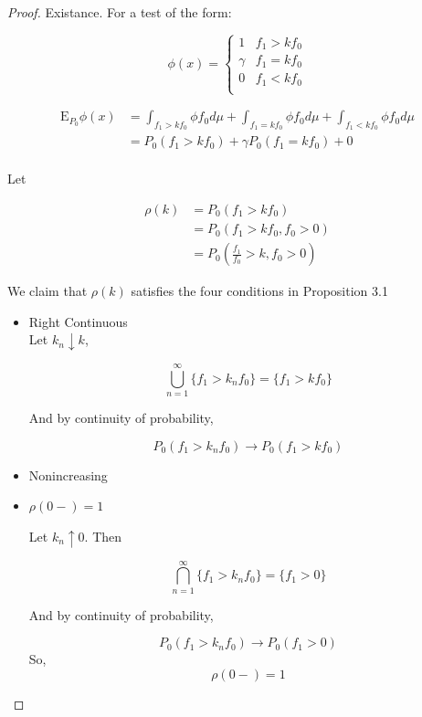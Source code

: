 \documentclass[11pt,fleqn]{book} %
\newcommand{\E}{\mathrm{E}}
\begin{document}
 \begin{proof}
 	Existance. For a test of the form: 

 			$$\phi(x) = \left\{\begin{array}{ll}
 				1 & f_1 > k f_0\\
 				\gamma & f_1 = k f_0\\
 				0 & f_1 < k f_0\\
 			\end{array} \right. $$

 			\begin{align*}
 				\E_{P_0} \phi(x) &= \int_{f_1 > k f_0} \phi f_0 d\mu + \int_{f_1 = k f_0} \phi f_0 d\mu + \int_{f_1 < k f_0} \phi f_0 d\mu\\
 					&=P_0(f_1 > k f_0) + \gamma P_0(f_1 = k f_0) + 0\\
 			\end{align*}

 	Let 

 			\begin{align*}
 				\rho(k) &= P_0(f_1 > k f_0)\\
 					&= P_0(f_1 > k f_0, f_0 > 0)\\
 					&= P_0 (\frac{f_1}{f_0} > k, f_0> 0)
 			\end{align*}

 	We claim that $\rho(k)$ satisfies the four conditions in Proposition 3.1

 			\begin{itemize}
 				\item Right Continuous\\

						Let $k_n \downarrow k$, 

								$$\bigcup^\infty_{n = 1} \{f_1 > k_n f_0\} = \{f_1 > k f_0\} $$ 
								
						And by continuity of probability, 

								$$P_0( f_1 > k_n f_0) \rightarrow P_0(f_1 > k f_0) $$

				\item Nonincreasing
				\item $\rho(0-) = 1$

						Let $k_n \uparrow 0$. Then

								$$\bigcap^\infty_{n = 1} \{f_1 > k_n f_0\} = \{f_1 > 0\} $$ 
								
						And by continuity of probability, 

								$$P_0( f_1 > k_n f_0) \rightarrow P_0(f_1 > 0) $$
						So,
								$$\rho(0-) = 1 $$ 				


\end{itemize}
\end{proof}
\end{document}
